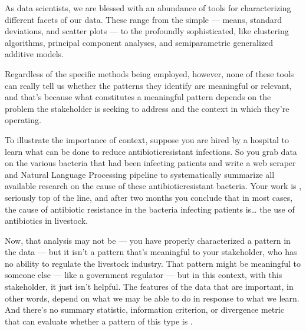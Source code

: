 \documentclass[letterpaper,10pt,english]{jupyterBook}
\begin{document}
\sphinxAtStartPar
As data scientists, we are blessed with an abundance of tools for characterizing different facets of our data. These range from the simple — means, standard deviations, and scatter plots — to the profoundly sophisticated, like clustering algorithms, principal component analyses, and semi\sphinxhyphen{}parametric generalized additive models.

\sphinxAtStartPar
Regardless of the specific methods being employed, however, none of these tools can really tell us whether the patterns they identify are meaningful or relevant, and that’s because what constitutes a meaningful pattern depends on the problem the stakeholder is seeking to address and the context in which they’re operating.

\sphinxAtStartPar
To illustrate the importance of context, suppose you are hired by a hospital to learn what can be done to reduce antibiotic\sphinxhyphen{}resistant infections. So you grab data on the various bacteria that had been infecting patients and write a web scraper and Natural Language Processing pipeline to systematically summarize all available research on the cause of these antibiotic\sphinxhyphen{}resistant bacteria. Your work is , seriously top of the line, and after two months you conclude that in most cases, the cause of antibiotic resistance in the bacteria infecting patients is… the use of antibiotics in livestock.

\sphinxAtStartPar
Now, that analysis may not be  — you have properly characterized a pattern in the data — but it isn’t a pattern that’s meaningful to your stakeholder, who has no ability to regulate the livestock industry. That pattern might be meaningful to someone else — like a government regulator — but in this context, with this stakeholder, it just isn’t helpful. The features of the data that are important, in other words, depend on what we may be able to do in response to what we learn. And there’s no summary statistic, information criterion, or divergence metric that can evaluate whether a pattern of this type is .
\end{document}
